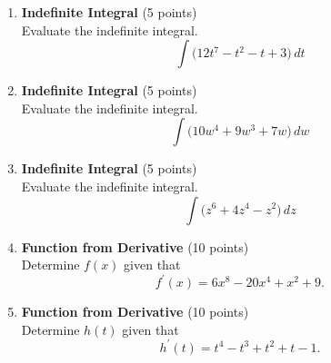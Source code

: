 \begin{enumerate}
  \item \textbf{Indefinite Integral} (5 points)\\
  Evaluate the indefinite integral.
  \[
    \int \bigl(12 t^7 - t^2 - t + 3\bigr) \,dt
  \]
  \begin{subanswer}
  \end{subanswer}

  \item \textbf{Indefinite Integral} (5 points)\\
  Evaluate the indefinite integral.
  \[
    \int \bigl(10 w^4 + 9 w^3 + 7 w\bigr) \,dw
  \]
  \begin{subanswer}
  \end{subanswer}

  \item \textbf{Indefinite Integral} (5 points)\\
  Evaluate the indefinite integral.
  \[
    \int \bigl(z^6 + 4 z^4 - z^2\bigr) \,dz
  \]
  \begin{subanswer}
  \end{subanswer}

  \item \textbf{Function from Derivative} (10 points)\\
  Determine $f(x)$ given that
  \[
    f^{\prime}(x) = 6 x^8 - 20 x^4 + x^2 + 9.
  \]
  \begin{subanswer}
  \end{subanswer}

  \item \textbf{Function from Derivative} (10 points)\\
  Determine $h(t)$ given that
  \[
    h^{\prime}(t) = t^4 - t^3 + t^2 + t - 1.
  \]
  \begin{subanswer}
  \end{subanswer}




  \newpage


\end{enumerate}

